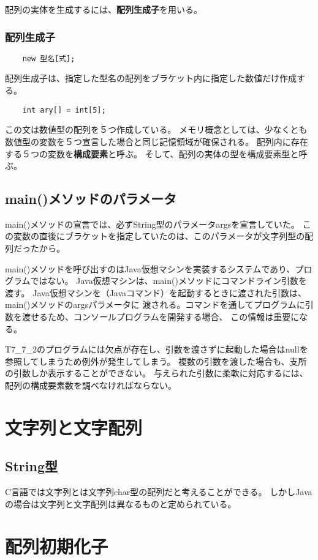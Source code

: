 \documentclass[12pt,a4j,twoside]{jsbook}
\begin{document}
配列の実体を生成するには、\textbf{配列生成子}を用いる。
\subsubsection*{配列生成子}
\begin{lstlisting}
    new 型名[式];
\end{lstlisting}
配列生成子は、指定した型名の配列をブラケット内に指定した数値だけ作成する。

\begin{lstlisting}
    int ary[] = int[5];
\end{lstlisting}
この文は数値型の配列を５つ作成している。
メモリ概念としては、少なくとも数値型の変数を５つ宣言した場合と同じ記憶領域が確保される。
配列内に存在する５つの変数を\textbf{構成要素}と呼ぶ。
そして、配列の実体の型を構成要素型と呼ぶ。

\subsection{main()メソッドのパラメータ}
main()メソッドの宣言では、必ずString型のパラメータargsを宣言していた。
この変数の直後にブラケットを指定していたのは、このパラメータが文字列型の配列だったから。

main()メソッドを呼び出すのはJava仮想マシンを実装するシステムであり、プログラムではない。
Java仮想マシンは、main()メソッドにコマンドライン引数を渡す。
Java仮想マシンを（Javaコマンド）を起動するときに渡された引数は、main()メソッドのargsパラメータに
渡される。コマンドを通してプログラムに引数を渡せるため、コンソールプログラムを開発する場合、
この情報は重要になる。

T7\_7\_2のプログラムには欠点が存在し、引数を渡さずに起動した場合はnullを参照してしまうため例外が発生してしまう。
複数の引数を渡した場合も、支所の引数しか表示することができない。
与えられた引数に柔軟に対応するには、配列の構成要素数を調べなければならない。

\section{文字列と文字配列}
\subsection{String型}
C言語では文字列とは文字列char型の配列だと考えることができる。
しかしJavaの場合は文字列と文字配列は異なるものと定められている。

\section{配列初期化子}
\end{document}
